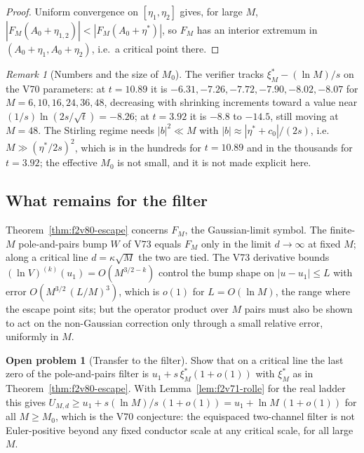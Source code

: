\documentclass[11pt]{article}
\theoremstyle{definition}
\newtheorem{problem}[theorem]{Open problem}
\theoremstyle{remark}
\newtheorem{remark}[theorem]{Remark}
\begin{document}
\begin{proof}
Uniform convergence on \([\eta_1,\eta_2]\) gives, for large \(M\),
\(|F_M(A_0+\eta_{1,2})|<|F_M(A_0+\eta^*)|\), so \(F_M\) has an interior
extremum in \((A_0+\eta_1,A_0+\eta_2)\), i.e.\ a critical point there.
\end{proof}

\begin{remark}[Numbers and the size of \(M_0\)]
\label{rem:f2v80-numbers}
The verifier tracks \(\xi^*_M-(\ln M)/s\) on the V70 parameters:
at \(t=10.89\) it is \(-6.31,-7.26,-7.72,-7.90,-8.02,-8.07\) for
\(M=6,10,16,24,36,48\), decreasing with shrinking increments toward a
value near \((1/s)\ln(2s/\sqrt t)=-8.26\); at \(t=3.92\) it is
\(-8.8\) to \(-14.5\), still moving at \(M=48\).  The Stirling regime
needs \(|b|^2\ll M\) with \(|b|\approx|\eta^*+c_0|/(2s)\), i.e.\
\(M\gg(\eta^*/2s)^2\), which is in the hundreds for \(t=10.89\) and in
the thousands for \(t=3.92\); the effective \(M_0\) is not small, and it
is not made explicit here.
\end{remark}

\subsection{What remains for the filter}

Theorem~\ref{thm:f2v80-escape} concerns \(F_M\), the Gaussian-limit
symbol.  The finite-\(M\) pole-and-pairs bump \(W\) of V73 equals \(F_M\)
only in the limit \(d\to\infty\) at fixed \(M\); along a critical line
\(d=\kappa\sqrt M\) the two are tied.  The V73 derivative bounds
\((\ln V)^{(k)}(u_1)=O(M^{3/2-k})\) control the bump shape on
\(|u-u_1|\le L\) with error \(O(M^{3/2}\,(L/M)^{3})\), which is \(o(1)\)
for \(L=O(\ln M)\), the range where the escape point sits; but the
operator product over \(M\) pairs must also be shown to act on the
non-Gaussian correction only through a small relative error, uniformly
in \(M\).

\begin{problem}[Transfer to the filter]
\label{prob:f2v80-transfer}
Show that on a critical line the last zero of the pole-and-pairs filter
is \(u_1+s\,\xi^*_M(1+o(1))\) with \(\xi^*_M\) as in
Theorem~\ref{thm:f2v80-escape}.  With Lemma~\ref{lem:f2v71-rolle} for
the real ladder this gives \(U_{M,d}\ge u_1+s(\ln M)/s\,(1+o(1))=u_1+\ln M\,(1+o(1))\)
for all \(M\ge M_0\), which is the V70 conjecture: the equispaced
two-channel filter is not Euler-positive beyond any fixed conductor
scale at any critical scale, for all large \(M\).
\end{problem}
\end{document}
